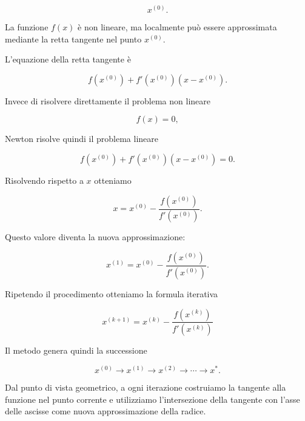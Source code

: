\begin{equation*}
    x^{(0)}.
\end{equation*}

La funzione $f(x)$ è non lineare, ma localmente può essere
approssimata mediante la retta tangente nel punto $x^{(0)}$.

L'equazione della retta tangente è

\begin{equation*}
    f(x^{(0)})
    +
    f'(x^{(0)})(x-x^{(0)}).
    \label{eq:newton_tangent}
\end{equation*}

Invece di risolvere direttamente il problema non lineare

\begin{equation*}
    f(x)=0,
\end{equation*}

Newton risolve quindi il problema lineare

\begin{equation*}
    f(x^{(0)})
    +
    f'(x^{(0)})(x-x^{(0)})
    =0.
\end{equation*}

Risolvendo rispetto a $x$ otteniamo

\begin{equation*}
    x
    =
    x^{(0)}
    -
    \frac{f(x^{(0)})}{f'(x^{(0)})}.
\end{equation*}

Questo valore diventa la nuova approssimazione:

\begin{equation*}
    x^{(1)}
    =
    x^{(0)}
    -
    \frac{f(x^{(0)})}{f'(x^{(0)})}.
\end{equation*}

Ripetendo il procedimento otteniamo la formula iterativa

\begin{equation}
    x^{(k+1)}
    =
    x^{(k)}
    -
    \frac{f(x^{(k)})}{f'(x^{(k)})}
\label{eq:newton_iteration}
\end{equation}

Il metodo genera quindi la successione

\begin{equation*}
    x^{(0)}
    \longrightarrow
    x^{(1)}
    \longrightarrow
    x^{(2)}
    \longrightarrow
    \cdots
    \longrightarrow
    x^*.
\end{equation*}

Dal punto di vista geometrico, a ogni iterazione costruiamo la
tangente alla funzione nel punto corrente e utilizziamo
l'intersezione della tangente con l'asse delle ascisse come nuova
approssimazione della radice.

